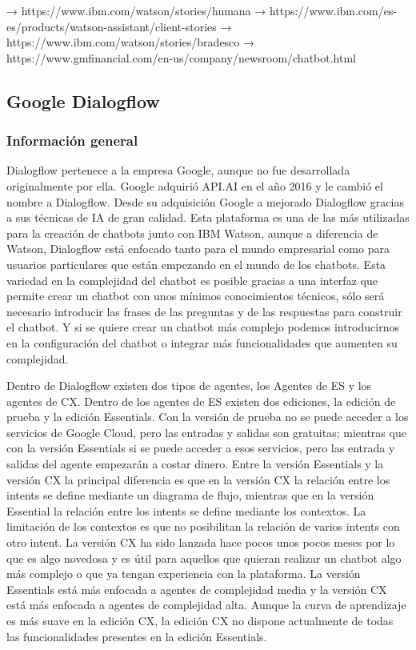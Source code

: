 → https://www.ibm.com/watson/stories/humana
→ https://www.ibm.com/es-es/products/watson-assistant/client-stories
→ https://www.ibm.com/watson/stories/bradesco
→ https://www.gmfinancial.com/en-us/company/newsroom/chatbot.html


\subsection{Google Dialogflow}\label{subsec:dialogflow}

\subsubsection*{Información general}

Dialogflow pertenece a la empresa Google, aunque no fue desarrollada originalmente por ella. Google adquirió API.AI en el año 2016 y le cambió el nombre a Dialogflow. Desde su adquisición Google a mejorado Dialogflow gracias a sus técnicas de IA de gran calidad. Esta plataforma es una de las más utilizadas para la creación de chatbots junto con IBM Watson, aunque a diferencia de Watson, Dialogflow está enfocado tanto para el mundo empresarial como para usuarios particulares que están empezando en el mundo de los chatbots. Esta variedad en la complejidad del chatbot es posible gracias a una interfaz que permite crear un chatbot con unos mínimos conocimientos técnicos, sólo será necesario introducir las frases de las preguntas y de las respuestas para construir el chatbot. Y si se quiere crear un chatbot más complejo podemos introducirnos en la configuración del chatbot o integrar más funcionalidades que aumenten su complejidad.

Dentro de Dialogflow existen dos tipos de agentes, los Agentes de ES y los agentes de CX. Dentro de los agentes de ES existen dos ediciones, la edición de prueba y la edición Essentials. Con la versión de prueba no se puede acceder a los servicios de Google Cloud, pero las entradas y salidas son gratuitas; mientras que con la versión Essentials si se puede acceder a esos servicios, pero las entrada y salidas del agente empezarán a costar dinero. Entre la versión Essentials y la versión CX la principal diferencia es que en la versión CX la relación entre los intents se define mediante un diagrama de flujo, mientras que en la versión Essential la relación entre los intents se define mediante los contextos. La limitación de los contextos es que no posibilitan la relación de varios intents con otro intent. La versión CX ha sido lanzada hace pocos unos pocos meses por lo que es algo novedosa y es útil para aquellos que quieran realizar un chatbot algo más complejo o que ya tengan experiencia con la plataforma. La versión Essentials está más enfocada a agentes de complejidad media y la versión CX está más enfocada a agentes de complejidad alta. Aunque la curva de aprendizaje es más suave en la edición CX, la edición CX no dispone actualmente de todas las funcionalidades presentes en la edición Essentials.

